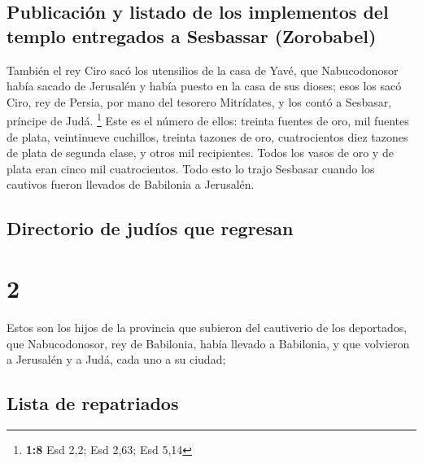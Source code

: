 \hypertarget{publicaciuxf3n-y-listado-de-los-implementos-del-templo-entregados-a-sesbassar-zorobabel}{%
\subsection{Publicación y listado de los implementos del templo
entregados a Sesbassar
(Zorobabel)}\label{publicaciuxf3n-y-listado-de-los-implementos-del-templo-entregados-a-sesbassar-zorobabel}}

 También el rey Ciro sacó los utensilios de la casa de
Yavé, que Nabucodonosor había sacado de Jerusalén y había puesto en la
casa de sus dioses;  esos los sacó Ciro, rey de Persia,
por mano del tesorero Mitrídates, y los contó a Sesbasar, príncipe de
Judá. \footnote{\textbf{1:8} Esd 2,2; Esd 2,63; Esd 5,14} 
Este es el número de ellos: treinta fuentes de oro, mil fuentes de
plata, veintinueve cuchillos,  treinta tazones de oro,
cuatrocientos diez tazones de plata de segunda clase, y otros mil
recipientes.  Todos los vasos de oro y de plata eran
cinco mil cuatrocientos. Todo esto lo trajo Sesbasar cuando los cautivos
fueron llevados de Babilonia a Jerusalén.

\hypertarget{directorio-de-juduxedos-que-regresan}{%
\subsection{Directorio de judíos que
regresan}\label{directorio-de-juduxedos-que-regresan}}

\hypertarget{section-1}{%
\section{2}\label{section-1}}

 Estos son los hijos de la provincia que subieron del
cautiverio de los deportados, que Nabucodonosor, rey de Babilonia, había
llevado a Babilonia, y que volvieron a Jerusalén y a Judá, cada uno a su
ciudad;

\hypertarget{lista-de-repatriados}{%
\subsection{Lista de repatriados}\label{lista-de-repatriados}}

